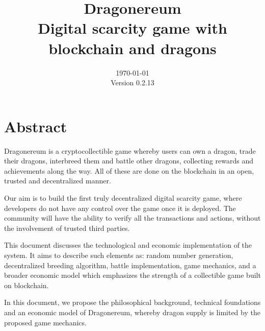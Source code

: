 \documentclass[12pt]{article}
\title{ \vspace{8cm}
        Dragonereum \\
		\normalsize Digital scarcity game with blockchain and dragons}
\date{\vspace{10.5cm}
        \today \\	
		\small Version 0.2.13}
\begin{document}
\sloppy %

\maketitle
\setlength{\parskip}{9.96pt}
 \par


\vspace{\baselineskip}

\vspace{\baselineskip}

\vspace{\baselineskip}
 \par

 \par

 \par



\section*{Abstract}
Dragonereum is a cryptocollectible game whereby users can own a dragon, trade their dragons, interbreed them and battle other dragons, collecting rewards and achievements along the way. All of these are done on the blockchain in an open, trusted and decentralized manner.\par

Our aim is to build the first truly decentralized digital scarcity game, where developers do not have any control over the game once it is deployed. The community will have the ability to verify all the transactions and actions, without the involvement of trusted third parties.\par

This document discusses the technological and economic implementation of the system. It aims to describe such elements as: random number generation, decentralized breeding algorithm, battle implementation, game mechanics, and a broader economic model which emphasizes the strength of a collectible game built on blockchain.\par

In this document, we propose the philosophical background, technical foundations and an economic model of Dragonereum, whereby dragon supply is limited by the proposed game mechanics.%

\end{document}
